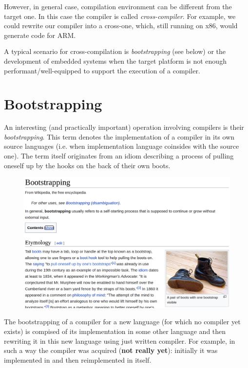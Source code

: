 However, in general case, compilation environment can be different from the target one. In this case the compiler is called
\emph{cross-compiler}. For example, we could rewrite our \lama compiler into a cross-one, which, still running on x86,
would generate code for ARM. 

A typical scenario for cross-compilation is \emph{bootstrapping} (see below) or the development of embedded systems when
the target platform is not enough performant/well-equipped to support the execution of a compiler.

\section{Bootstrapping}

An interesting (and practically important) operation involving compilers is their \emph{bootstrapping}. This term denotes the
implementation of a compiler in its own source languages (i.e. when implementation language coinsides with the source one).
The term itself originates from an idiom describing a process of pulling oneself up by the hooks on the back of their own
boots.

\begin{figure}[h]
  \centering
  \includegraphics[scale=0.2]{images/bootstrapping.png}
\end{figure}

The bootstrapping of a compiler for a new language (for which no compiler yet exists) is compised of its implementation
in some other language and then rewriting it in this new language using just written compiler. For example, in such a way the \lama compiler was
acquired (\textbf{not really yet}): initially it was implemented in  and then reimplemented in
\lama itself.

